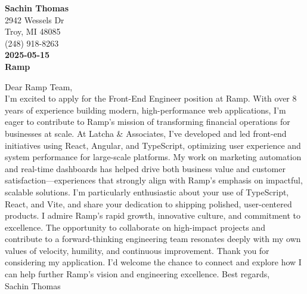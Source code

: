 
\noindent \textbf{Sachin Thomas} \\
2942 Wessels Dr \\
Troy, MI 48085 \\
(248) 918-8263 \\
\vspace{8pt}
\noindent \textbf{2025-05-15} \\
\vspace{4pt}
\noindent \textbf{Ramp}
\newline

\noindent Dear Ramp Team, \\

\noindent I'm excited to apply for the Front-End Engineer position at Ramp. With over 8 years of experience building modern, high-performance web applications, I'm eager to contribute to Ramp's mission of transforming financial operations for businesses at scale.
\newline\newline
\noindent At Latcha \& Associates, I've developed and led front-end initiatives using React, Angular, and TypeScript, optimizing user experience and system performance for large-scale platforms. My work on marketing automation and real-time dashboards has helped drive both business value and customer satisfaction—experiences that strongly align with Ramp's emphasis on impactful, scalable solutions. I'm particularly enthusiastic about your use of TypeScript, React, and Vite, and share your dedication to shipping polished, user-centered products.
\newline\newline
\noindent I admire Ramp's rapid growth, innovative culture, and commitment to excellence. The opportunity to collaborate on high-impact projects and contribute to a forward-thinking engineering team resonates deeply with my own values of velocity, humility, and continuous improvement.
\newline\newline
Thank you for considering my application. I'd welcome the chance to connect and explore how I can help further Ramp's vision and engineering excellence.
\newline\newline
\noindent Best regards,\\
\noindent Sachin Thomas

